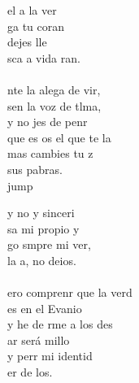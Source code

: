 \begin{cancion}%
	 el a la ver \\
	ga tu coran \\
	  dejes lle\\
	sca a vida ran. \\
	\jump\\
	nte la alega de vir, \\
	sen la voz de tlma, \\
	y no jes de penr\\
	que es os el que te la\\
	mas  cambies tu z\\
	 sus pabras.\\jump\\
	\begin{chorus}%
	y no y sinceri\\
	sa mi propio y\\
	go smpre mi ver,\\
	 la a, no deios.\\
	\jump\\
	ero comprenr que la verd\\
	es en el Evanio \\
	y he de rme a los des \\
	ar será millo\\
	y perr mi identid\\
	er de los.\\
	\end{chorus}%
	\jump\\
\end{cancion}%

